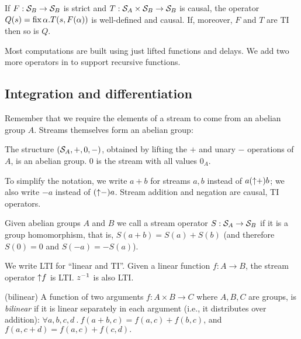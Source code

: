 
\begin{lemma}\label{feedback-semantics}
\label{cor-loop}
If $F: \mathcal{S}_{B} \to \mathcal{S}_{B}$ is strict and $T: \mathcal{S}_{A} \times \mathcal{S}_{B} \to \mathcal{S}_{B}$ is causal,
the operator $Q(s)=\mbox{fix}\,\alpha.T(s,F(\alpha))$ is well-defined and causal.
If, moreover, $F$ and $T$ are TI then so is $Q$.
\end{lemma}

Most \dbsp computations are built using just lifted functions and
delays.  We add two more operators in  to support
recursive functions.

\subsection{Integration and differentiation}\label{sec:abelianstreams}

Remember that we require the elements of a stream to come from an abelian group $A$.
Streams themselves form an abelian group:

\begin{proposition}
The structure $(\mathcal{S}_{A},+,0,-)$, obtained by lifting the $+$ and unary $-$ operations of $A$,
is an abelian group.  0 is the stream with all values $0_A$.
\end{proposition}

\noindent
To simplify the notation, we write $a + b$ for streams $a, b$ instead
of $a ({\uparrow}+) b$; we also write $-a$ instead of $({\uparrow}-)a$.
Stream addition and negation are causal, TI operators.

\begin{definition}
Given abelian groups $A$ and $B$ we call a stream operator
$S: \mathcal{S}_{A} \rightarrow \mathcal{S}_{B}$  if it is a group homomorphism, that is,
$S(a+b)=S(a)+S(b)$ (and therefore $S(0)=0$ and $S(-a)=-S(a)$).
\end{definition}

We write LTI for ``linear and TI''.  Given a linear function $f: A \to
B$, the stream operator ${\uparrow}f$ is LTI.  $z^{-1}$ is also LTI.

\begin{definition}(bilinear)
A function of two arguments $f: A \times B \to C$ where $A, B, C$ are
groups, is \emph{bilinear} if it is linear separately in each argument
(i.e., it distributes over addition): $\forall a, b, c, d~.~f(a+b, c)
= f(a, c) + f(b, c)$, and $f(a, c+d) = f(a, c) + f(c, d).$
\end{definition}

